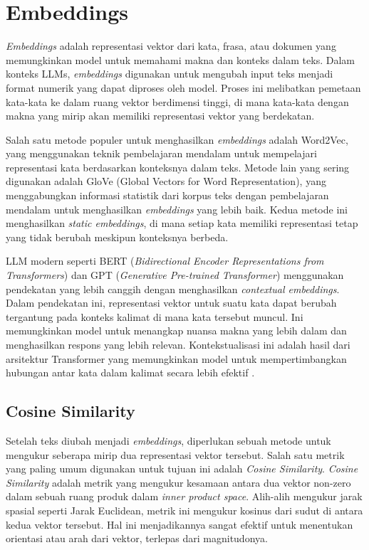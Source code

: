\section{Embeddings}
\label{sec:embeddings}

\textit{Embeddings} adalah representasi vektor dari kata, frasa, atau dokumen yang memungkinkan model untuk memahami makna dan konteks dalam teks. Dalam konteks LLMs, \textit{embeddings} digunakan untuk mengubah input teks menjadi format numerik yang dapat diproses oleh model. Proses ini melibatkan pemetaan kata-kata ke dalam ruang vektor berdimensi tinggi, di mana kata-kata dengan makna yang mirip akan memiliki representasi vektor yang berdekatan.

Salah satu metode populer untuk menghasilkan \textit{embeddings} adalah Word2Vec, yang menggunakan teknik pembelajaran mendalam untuk mempelajari representasi kata berdasarkan konteksnya dalam teks. Metode lain yang sering digunakan adalah GloVe (Global Vectors for Word Representation), yang menggabungkan informasi statistik dari korpus teks dengan pembelajaran mendalam untuk menghasilkan \textit{embeddings} yang lebih baik. Kedua metode ini menghasilkan \textit{static embeddings}, di mana setiap kata memiliki representasi tetap yang tidak berubah meskipun konteksnya berbeda.

LLM modern seperti BERT (\textit{Bidirectional Encoder Representations from Transformers}) dan GPT (\textit{Generative Pre-trained Transformer}) menggunakan pendekatan yang lebih canggih dengan menghasilkan \textit{contextual embeddings}. Dalam pendekatan ini, representasi vektor untuk suatu kata dapat berubah tergantung pada konteks kalimat di mana kata tersebut muncul. Ini memungkinkan model untuk menangkap nuansa makna yang lebih dalam dan menghasilkan respons yang lebih relevan. Kontekstualisasi ini adalah hasil dari arsitektur Transformer yang memungkinkan model untuk mempertimbangkan hubungan antar kata dalam kalimat secara lebih efektif \parencite{vaswani2023attentionneed}.

\subsection{Cosine Similarity}
\label{sec:cosine_similarity}

Setelah teks diubah menjadi \textit{embeddings}, diperlukan sebuah metode untuk mengukur seberapa mirip dua representasi vektor tersebut. Salah satu metrik yang paling umum digunakan untuk tujuan ini adalah \textit{Cosine Similarity}. \textit{Cosine Similarity} adalah metrik yang mengukur kesamaan antara dua vektor non-zero dalam sebuah ruang produk dalam \textit{inner product space}. Alih-alih mengukur jarak spasial seperti Jarak Euclidean, metrik ini mengukur kosinus dari sudut di antara kedua vektor tersebut. Hal ini menjadikannya sangat efektif untuk menentukan orientasi atau arah dari vektor, terlepas dari magnitudonya.

